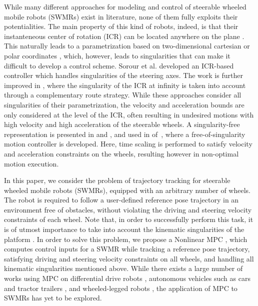 While many different approaches for modeling and control of steerable wheeled mobile robots (SWMRs) exist in literature, none of them fully exploits their potentialities. The main property of this kind of robots, indeed, is that their instanteneous center of rotation (ICR) can be located anywhere on the plane \cite{Campion1996TR}. This naturally leads to a parametrization based on two-dimensional cartesian \cite{Sorour2016ICRA} or polar coordinates \cite{Connette2008CDC}, which, however, leads to singularities that can make it difficult to develop a control scheme. Sorour et al. \cite{Sorour2017RAL} developed an ICR-based controller which handles singularities of the steering axes. The work is further improved in \cite{Sorour2019RAS}, where the singularity of the ICR at infinity is taken into account through a complementary route strategy. While these approaches consider all singularities of their parametrization, the velocity and acceleration bounds are only considered at the level of the ICR, often resulting in undesired motions with high velocity and high acceleration of the steerable wheels. A singularity-free representation is presented in \cite{Ferland2010IROS} and \cite{Clavien2018EstimationoftheICR}, and used in of~\cite{Clavien2018ICRMotionControl}, where a free-of-singularity motion controller is developed. Here, time scaling is performed to satisfy velocity and acceleration constraints on the wheels, resulting however in non-optimal motion execution.

In this paper, we consider the problem of trajectory tracking for steerable wheeled mobile robots (SWMRs), equipped with an arbitrary number of wheels. The robot is required to follow a user-defined reference pose trajectory in an environment free of obstacles, without violating the driving and steering velocity constraints of each wheel. Note that, in order to successfully perform this task, it is of utmost importance to take into account the kinematic singularities of the platform \cite{Sorour2019RAS}. In order to solve this problem, we propose a Nonlinear MPC \cite{Rawlings2017MPCBook}, which computes control inputs for a SWMR while tracking a reference pose trajectory, satisfying driving and steering velocity constraints on all wheels, and handling all kinematic singularities mentioned above. While there exists a large number of works using MPC on differential drive robots \cite{Tarantos2023Springer}, autonomous vehicles such as cars \cite{Zanon2014Springer} and tractor trailers \cite{Beglini2022TMECH}, and wheeled-legged robots \cite{Bjelonic2021IROS}, the application of MPC to SWMRs has yet to be explored.

